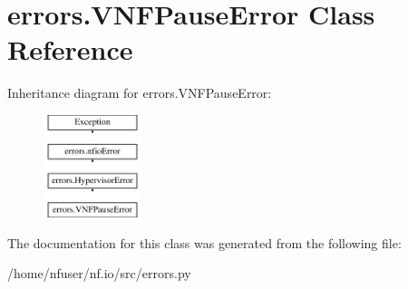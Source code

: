 \hypertarget{classerrors_1_1VNFPauseError}{\section{errors.\-V\-N\-F\-Pause\-Error Class Reference}
\label{classerrors_1_1VNFPauseError}
}
Inheritance diagram for errors.\-V\-N\-F\-Pause\-Error\-:\begin{figure}[H]
\begin{center}
\leavevmode
\includegraphics[height=3.000000cm]{classerrors_1_1VNFPauseError}
\end{center}
\end{figure}


The documentation for this class was generated from the following file\-:\begin{DoxyCompactItemize}
\item 
/home/nfuser/nf.\-io/src/errors.\-py\end{DoxyCompactItemize}
